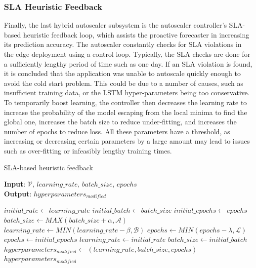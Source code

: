 \subsubsection{SLA Heuristic Feedback}

Finally, the last hybrid autoscaler subsystem is the autoscaler controller's SLA-based heuristic feedback loop, which assists the proactive forecaster in increasing its prediction accuracy. The autoscaler constantly checks for SLA violations in the edge deployment using a control loop. Typically, the SLA checks are done for a sufficiently lengthy period of time such as one day. If an SLA violation is found, it is concluded that the application was unable to autoscale quickly enough to avoid the cold start problem. This could be due to a number of causes, such as insufficient training data, or the LSTM hyper-parameters being too conservative. To temporarily boost learning, the controller then decreases the learning rate to increase the probability of the model escaping from the local minima to find the global one, increases the batch size to reduce under-fitting, and increases the number of epochs to reduce loss. All these parameters have a threshold, as increasing or decreasing certain parameters by a large amount may lead to issues such as over-fitting or infeasibly lengthy training times.\par

\begin{algorithm}
    \caption{SLA-based heuristic feedback}
    \label{alg:sla-heuristic-feedback}
    \textbf{Input}: $\mathcal{V},\,learning\_rate,\,batch\_size,\,epochs$\\
    \textbf{Output}: $hyperparameters_{modified}$
    \begin{algorithmic}
        \State $initial\_rate \gets learning\_rate$
        \State $initial\_batch \gets batch\_size$
        \State $initial\_epochs \gets epochs$
            \State $batch\_size \gets MAX(batch\_size + \alpha, \mathcal{A})$
            \State $learning\_rate \gets MIN(learning\_rate - \beta, \mathcal{B})$
            \State $epochs \gets MIN(epochs - \lambda, \mathcal{L})$
        \Else
            \State $epochs \gets initial\_epochs$
            \State $learning\_rate \gets initial\_rate$
            \State $batch\_size \gets initial\_batch$
        \EndIf
        \State $hyperparameters_{modified} \gets (learning\_rate, batch\_size, epochs)$
        \State \Return $hyperparameters_{modified}$
    \end{algorithmic}
\end{algorithm}

